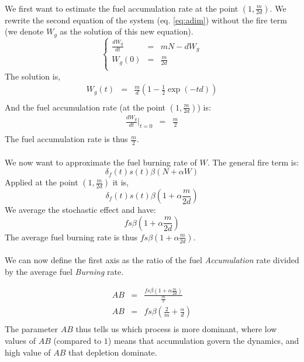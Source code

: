 \documentclass{article}
\begin{document}
\paragraph{}
We first want to estimate the fuel accumulation rate at the point $(1, \frac{m}{2d})$. We rewrite the second equation of the system (eq. \ref{eq:adim}) without the fire term (we denote $W_g$ as the solution of this new equation).
\[
\left\lbrace
\begin{array}{rcl}
\frac{d W_g}{dt} & = & mN-dW_g \\
W_g(0) & = & \frac{m}{2d} \\
\end{array}
\right.
\]
The solution is,
\[
\begin{array}{rcl}
W_g(t) & = & \frac{m}{d}(1-\frac{1}{2}\exp(-td)) \\
\end{array}
\]
And the fuel accumulation rate (at the point $(1, \frac{m}{2d})$) is: 
\[
\begin{array}{rcl}
\frac{dW_g}{dt}|_{t=0} & = & \frac{m}{2} \\
\end{array}
\]
The fuel accumulation rate is thus $\frac{m}{2}$.

\paragraph{}
We now want to approximate the fuel burning rate of $W$. The general fire term is:
\[
\delta_f(t)s(t)\beta(N+\alpha W)
\]
Applied at the point $(1, \frac{m}{2d})$ it is,
\[
\delta_f(t)s(t)\beta(1+\alpha\frac{m}{2d})
\]
We average the stochastic effect and have:
\[
fs\beta(1+\alpha\frac{m}{2d})
\]
The average fuel burning rate is thus $fs\beta(1+\alpha\frac{m}{2d})$.

\paragraph{}
We can now define the first axis as the ratio of the fuel \textit{Accumulation} rate divided by the average fuel \textit{Burning} rate.

\[
\begin{array}{rcl}
AB & = & \frac{fs\beta(1+\alpha\frac{m}{2d})}{\frac{m}{2}} \\
AB & = & fs\beta(\frac{2}{m}+\frac{\alpha}{d}) \\
\end{array}
\]
The parameter $AB$ thus tells us which process is more dominant, where low values of $AB$ (compared to $1$) means that accumulation govern the dynamics, and high value of $AB$ that depletion dominate.
\end{document}
